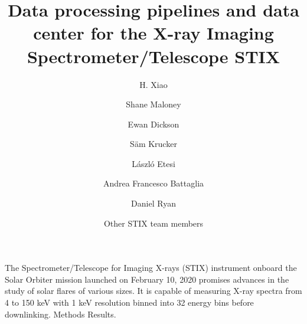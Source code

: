 \documentclass{aa}
\begin{document}
 


   \title{Data processing pipelines and data center for the X-ray Imaging Spectrometer/Telescope STIX}

   \subtitle{}

   \author{H. Xiao
          \and 
          Shane Maloney 
          \and 
          Ewan Dickson 
          \and 
          S\"am Krucker
            \and László Etesi 
          \and Andrea Francesco Battaglia
          \and Daniel Ryan
          \and Other STIX team members
         }


   \date{}

 
  \abstract
   {} %
   { The Spectrometer/Telescope for Imaging X-rays (STIX) instrument onboard the Solar Orbiter mission launched on February 10, 2020 promises advances in the study of solar flares of various sizes. It is capable of measuring X-ray spectra from 4 to 150 keV with 1 keV resolution binned into 32 energy bins before downlinking.  }
   {Methods}
   {Results.}
   {}


   \maketitle
%
\end{document}
